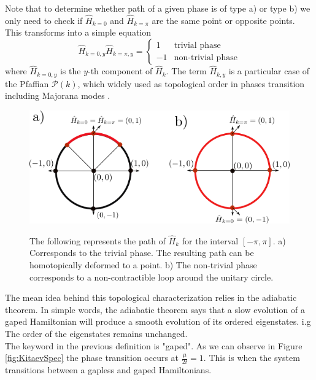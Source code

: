 Note that to determine whether path of a given phase is of type a) or type b) we only need to check if $\hat{H}_{k=0}$ and $\hat{H}_{k=\pi}$ are the same point or opposite points. This transforms into a simple equation 
\begin{equation}
    \hat{H}_{k=0,y}\hat{H}_{k=\pi,y}=\begin{cases}
1 & \mbox{trivial phase}\\
-1 & \mbox{non-trivial phase}
\end{cases}
\end{equation}
where $\hat{H}_{k=0,y}$ is the $y$-th component of $\hat{H}_{k}$. The term $\hat{H}_{k,y}$ is a particular case of the Pfaffian $\mathcal{P}(k)$, which widely used as topological order in  phases transition including  Majorana modes . 


\begin{figure}[t]
    \centering
    \includegraphics[scale=0.8]{IMAGES/Majorana/Topological.png}
    \label{fig:topological}
    \caption{ The following represents the path of $\hat{H}_k$ for the interval $[ -\pi, \pi ]$. a) Corresponds to the trivial phase. The resulting path can be homotopically deformed to a point. b) The non-trivial phase corresponds to a non-contractible loop around the unitary circle. \protect {}} 
\end{figure}

The mean idea behind this topological characterization relies in the adiabatic theorem.  In simple words, the adiabatic theorem says that a slow evolution of a gaped Hamiltonian will produce a smooth evolution of its ordered eigenstates. i.g The order of the eigenstates remains unchanged. \\

The keyword in the previous definition is "gaped". As we can observe in Figure \ref{fig:KitaevSpec} the phase transition occurs at $\frac{\mu}{2t}=1$. This is when the system transitions between a gapless and gaped Hamiltonians.  \\

